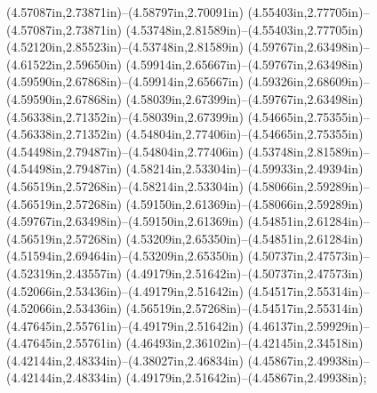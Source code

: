 (4.57087in,2.73871in)--(4.58797in,2.70091in) (4.55403in,2.77705in)--(4.57087in,2.73871in) (4.53748in,2.81589in)--(4.55403in,2.77705in) (4.52120in,2.85523in)--(4.53748in,2.81589in) (4.59767in,2.63498in)--(4.61522in,2.59650in) (4.59914in,2.65667in)--(4.59767in,2.63498in) (4.59590in,2.67868in)--(4.59914in,2.65667in) (4.59326in,2.68609in)--(4.59590in,2.67868in) (4.58039in,2.67399in)--(4.59767in,2.63498in) (4.56338in,2.71352in)--(4.58039in,2.67399in) (4.54665in,2.75355in)--(4.56338in,2.71352in) (4.54804in,2.77406in)--(4.54665in,2.75355in) (4.54498in,2.79487in)--(4.54804in,2.77406in) (4.53748in,2.81589in)--(4.54498in,2.79487in) (4.58214in,2.53304in)--(4.59933in,2.49394in) (4.56519in,2.57268in)--(4.58214in,2.53304in) (4.58066in,2.59289in)--(4.56519in,2.57268in) (4.59150in,2.61369in)--(4.58066in,2.59289in) (4.59767in,2.63498in)--(4.59150in,2.61369in) (4.54851in,2.61284in)--(4.56519in,2.57268in) (4.53209in,2.65350in)--(4.54851in,2.61284in) (4.51594in,2.69464in)--(4.53209in,2.65350in) (4.50737in,2.47573in)--(4.52319in,2.43557in) (4.49179in,2.51642in)--(4.50737in,2.47573in) (4.52066in,2.53436in)--(4.49179in,2.51642in) (4.54517in,2.55314in)--(4.52066in,2.53436in) (4.56519in,2.57268in)--(4.54517in,2.55314in) (4.47645in,2.55761in)--(4.49179in,2.51642in) (4.46137in,2.59929in)--(4.47645in,2.55761in) (4.46493in,2.36102in)--(4.42145in,2.34518in) (4.42144in,2.48334in)--(4.38027in,2.46834in) (4.45867in,2.49938in)--(4.42144in,2.48334in) (4.49179in,2.51642in)--(4.45867in,2.49938in);
